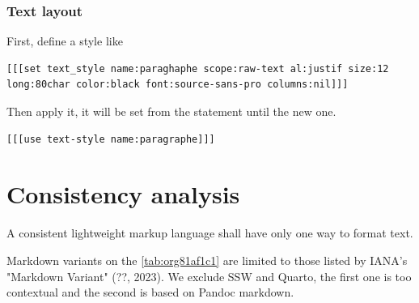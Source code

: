 \documentclass[a4paper,12pt]{article}
\begin{document}
\subsubsection{Text layout}
\label{sec:orgf9ec3da}
First, define a style like
\begin{verbatim}
[[[set text_style name:paraghaphe scope:raw-text al:justif size:12 long:80char color:black font:source-sans-pro columns:nil]]]
\end{verbatim}

Then apply it, it will be set from the statement until the new one.
\begin{verbatim}
[[[use text-style name:paragraphe]]]
\end{verbatim}
\section{Consistency analysis}
\label{sec:orgddf1e0d}
A consistent lightweight markup language shall have only one way to format text.

Markdown variants on the \ref{tab:org81af1c1} are limited to those listed by IANA's "Markdown Variant" (??, 2023). We exclude SSW and Quarto, the first one is too contextual and the second is based on Pandoc markdown.
\end{document}

